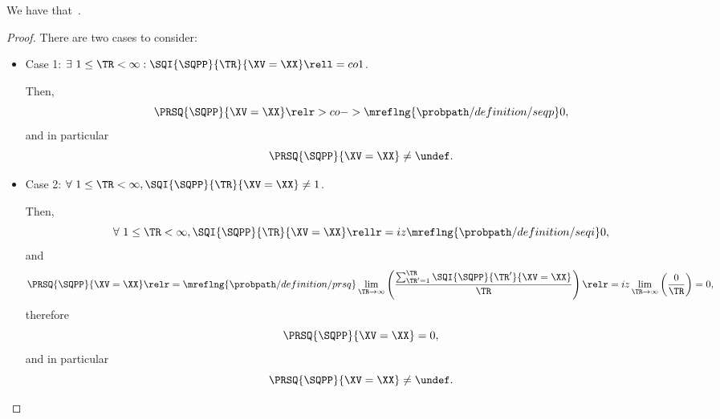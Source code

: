 \begin{proposition}
  We have that\ \sqpproblimdefprop.%
\end{proposition}

\begin{proof}
  There are two cases to consider:
  \begin{itemize}
    \item {} Case 1: $\exists\ 1 \le \TR < \infty : \SQI{\SQPP}{\TR}{\XV = \XX} \rell = co 1$.

      Then,
      $$\PRSQ{\SQPP}{\XV = \XX} \relr > co->\mreflng{\probpath/definition/seqp} 0,$$
      and in particular
      $$\PRSQ{\SQPP}{\XV = \XX} \ne \undef.$$

    \item {} Case 2: $\forall\ 1 \le \TR < \infty, \SQI{\SQPP}{\TR}{\XV= \XX} \ne 1$.

      Then,
      $$\forall\ 1 \le \TR < \infty, \SQI{\SQPP}{\TR}{\XV = \XX} \rellr = iz \mreflng{\probpath/definition/seqi} 0,$$
      and
      $$\PRSQ{\SQPP}{\XV = \XX} 
      \relr = \mreflng{\probpath/definition/prsq} \lim_{\TR \rightarrow \infty}\left(\frac{\sum_{\TR' = 1}^{\TR}\SQI{\SQPP}{\TR'}{\XV= \XX}}{\TR}\right)
      \relr = iz \lim_{\TR \rightarrow \infty}\left(\frac{0}{\TR}\right) = 0
      ,$$
      therefore
      $$\PRSQ{\SQPP}{\XV = \XX} = 0,$$
      and in particular
      $$\PRSQ{\SQPP}{\XV = \XX} \ne \undef.$$
  \end{itemize}
\end{proof}
